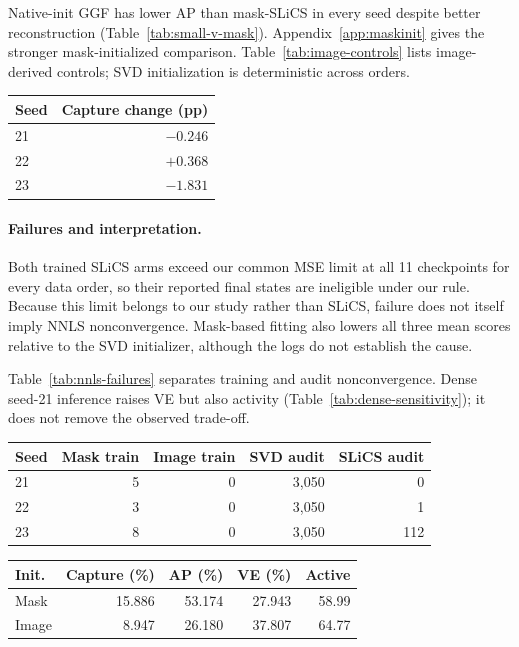 Native-init GGF has lower AP than mask-SLiCS in every seed despite
better reconstruction (Table~\ref{tab:small-v-mask}). Appendix~\ref{app:maskinit}
gives the stronger mask-initialized comparison. Table~\ref{tab:image-controls}
lists image-derived controls; SVD initialization is deterministic across orders.
\begin{agfresulttable}
\caption{Native-init GGF minus mask-SLiCS: capture differences.}\label{tab:small-v-mask}
\begin{tabular}{@{}lr@{}}
\toprule
Seed & Capture change (pp) \\
\midrule
21 & $-0.246$ \\
22 & $+0.368$ \\
23 & $-1.831$ \\
\bottomrule
\end{tabular}

\end{agfresulttable}

\paragraph{Failures and interpretation.}
Both trained SLiCS arms exceed our common MSE limit at all 11 checkpoints
for every data order, so their reported final states are ineligible under
our rule. Because this limit belongs to our study rather than SLiCS, failure
does not itself imply NNLS nonconvergence. Mask-based fitting also lowers
all three mean scores relative to the SVD initializer, although the logs
do not establish the cause.

Table~\ref{tab:nnls-failures} separates training and audit
nonconvergence. Dense seed-21 inference raises VE but also activity
(Table~\ref{tab:dense-sensitivity}); it does not remove the observed trade-off.
\begin{agfresulttable}
\caption{Nonconverged NNLS calls, by order. Training uses batches; audit uses inference calls.}\label{tab:nnls-failures}
\begin{tabular}{@{}lrrrr@{}}
\toprule
Seed & Mask train & Image train & SVD audit & SLiCS audit \\
\midrule
21 & 5 & 0 & 3,050 & 0 \\
22 & 3 & 0 & 3,050 & 1 \\
23 & 8 & 0 & 3,050 & 112 \\
\bottomrule
\end{tabular}

\end{agfresulttable}
\begin{agfresulttable}
\caption{Seed-21 dense inference sensitivity, not the primary Top-16 comparison.}\label{tab:dense-sensitivity}
\begin{tabular}{@{}lrrrr@{}}
\toprule
Init. & Capture (\%) & AP (\%) & VE (\%) & Active \\
\midrule
Mask & 15.886 & 53.174 & 27.943 & 58.99 \\
Image & 8.947 & 26.180 & 37.807 & 64.77 \\
\bottomrule
\end{tabular}

\end{agfresulttable}

